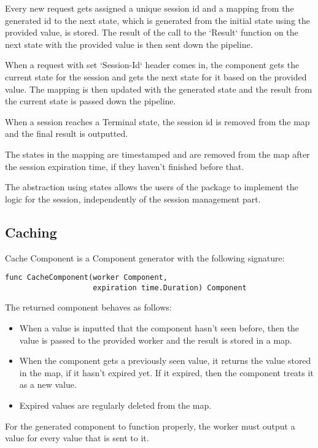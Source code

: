 \documentclass[12pt,a4paper]{article}
\begin{document}
Every new request gets assigned a unique session id and a mapping from the generated 
id to the next state, which is generated from the initial state using the provided value,
is stored. The result of the call to the `Result` function on the next state with the provided 
value is then sent down the pipeline.

When a request with set `Session-Id` header comes in, the component gets the current 
state for the session and gets the next state for it based on the provided value.
The mapping is then updated with the generated state and the result from the current state
is passed down the pipeline.

When a session reaches a Terminal state, the session id is removed from the map
and the final result is outputted.

The states in the mapping are timestamped and are removed from the map after
the session expiration time, if they haven't finished before that.

The abstraction using states allows the users of the package to implement the
logic for the session, independently of the session management part.

\subsection{Caching}
Cache Component is a Component generator with the following signature:
\begin{lstlisting}
func CacheComponent(worker Component, 
					expiration time.Duration) Component
\end{lstlisting}
The returned component behaves as follows:
\begin{itemize}
	\item When a value is inputted that the component hasn't seen before, then
				the value is passed to the provided worker and the result is stored in
				a map.
	\item When the component gets a previously seen value, it returns the value
			  stored in the map, if it hasn't expired yet. If it expired, then the component
				treats it as a new value.
	\item Expired values are regularly deleted from the map.
\end{itemize}

For the generated component to function properly, the worker must output
a value for every value that is sent to it.
\end{document}
